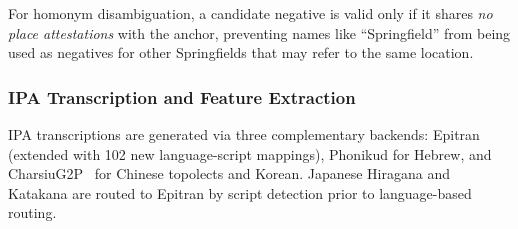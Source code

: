 \documentclass[11pt,a4paper]{article}
\begin{document}
For homonym disambiguation, a candidate negative is valid only if it shares \emph{no place attestations} with the anchor, preventing names like ``Springfield'' from being used as negatives for other Springfields that may refer to the same location.

\subsubsection{IPA Transcription and Feature Extraction}
\label{subsec:g2p}

IPA transcriptions are generated via three complementary backends: Epitran~\citep{mortensen2018} (extended with 102 new language-script mappings), Phonikud for Hebrew, and CharsiuG2P~\citep{zhu2022charsiu-g2p} for Chinese topolects and Korean. Japanese Hiragana and Katakana are routed to Epitran by script detection prior to language-based routing.
\end{document}
